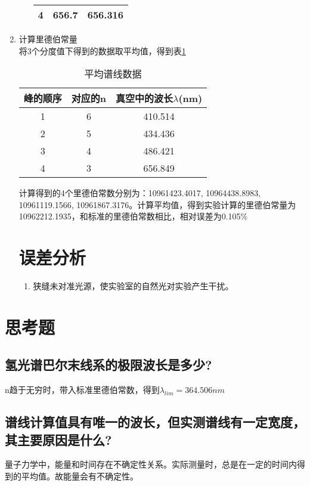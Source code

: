 \documentclass[a4paper]{article}
\begin{document}
\begin{enumerate}
\begin{enumerate}
\begin{table}[!h]
\begin{tabular}{|c|c|c|}
4   & 656.7              & 656.316 \\ \hline
\end{tabular}
\end{table}
\end{enumerate}
\item 计算里德伯常量\\
将3个分度值下得到的数据取平均值，得到表\ref{table_ave}
\begin{table}[!h]
    \centering
    \caption{平均谱线数据}
    \label{table_ave}
    \begin{tabular}{|c|c|c|}
    \hline
    峰的顺序    & 对应的n  & 真空中的波长$\lambda$(nm) \\ \hline
    1   & 6            & 410.514 \\ \hline
    2   & 5             & 434.436 \\ \hline
    3   & 4             & 486.421 \\ \hline
    4   & 3       & 656.849 \\ \hline
    \end{tabular}
    \end{table}

计算得到的4个里德伯常数分别为：10961423.4017, 10964438.8983, 10961119.1566, 10961867.3176。计算平均值，得到实验计算的里德伯常量为10962212.1935，和标准的里德伯常数相比，相对误差为0.105$\%$
\section{误差分析}
\begin{enumerate}
\item 狭缝未对准光源，使实验室的自然光对实验产生干扰。
\end{enumerate}

\end{enumerate}
\section{思考题}
\subsection{氢光谱巴尔末线系的极限波长是多少?}
n趋于无穷时，带入标准里德伯常数，得到$ \lambda_{lim} = 364.506nm$
\subsection{谱线计算值具有唯一的波长，但实测谱线有一定宽度，其主要原因是什么? }
量子力学中，能量和时间存在不确定性关系。实际测量时，总是在一定的时间内得到的平均值。故能量会有不确定性。
\nocite{jiaocai}

\end{document}
